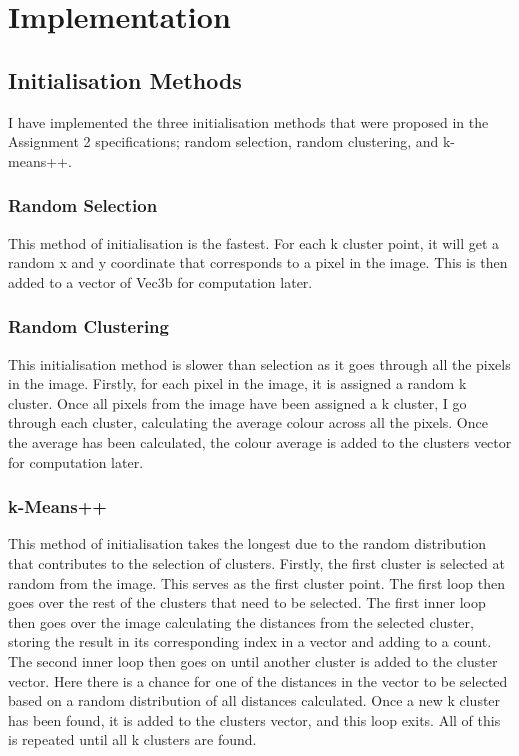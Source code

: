 \documentclass{article}
\begin{document}

\section{Implementation}

\subsection{Initialisation Methods}
I have implemented the three initialisation methods that were proposed in the
Assignment 2 specifications; random selection, random clustering, and k-means++.

\subsubsection{Random Selection}
This method of initialisation is the fastest. For each k cluster point, it will
get a random x and y coordinate that corresponds to a pixel in the image. This
is then added to a vector of Vec3b for computation later.

\subsubsection{Random Clustering}
This initialisation method is slower than selection as it goes through all the
pixels in the image. Firstly, for each pixel in the image, it is assigned a
random k cluster. Once all pixels from the image have been assigned a k cluster,
I go through each cluster, calculating the average colour across all the
pixels. Once the average has been calculated, the colour average is added to the
clusters vector for computation later.

\subsubsection{k-Means++}
This method of initialisation takes the longest due to the random distribution
that contributes to the selection of clusters. Firstly, the first cluster is
selected at random from the image. This serves as the first cluster point. The
first loop then goes over the rest of the clusters that need to be selected. The
first inner loop then goes over the image calculating the distances from the
selected cluster, storing the result in its corresponding index in a vector and
adding to a count. The second inner loop then goes on until another cluster is
added to the cluster vector. Here there is a chance for one of the distances in
the vector to be selected based on a random distribution of all distances
calculated. Once a new k cluster has been found, it is added to the clusters
vector, and this loop exits. All of this is repeated until all k clusters are
found.
\end{document}
